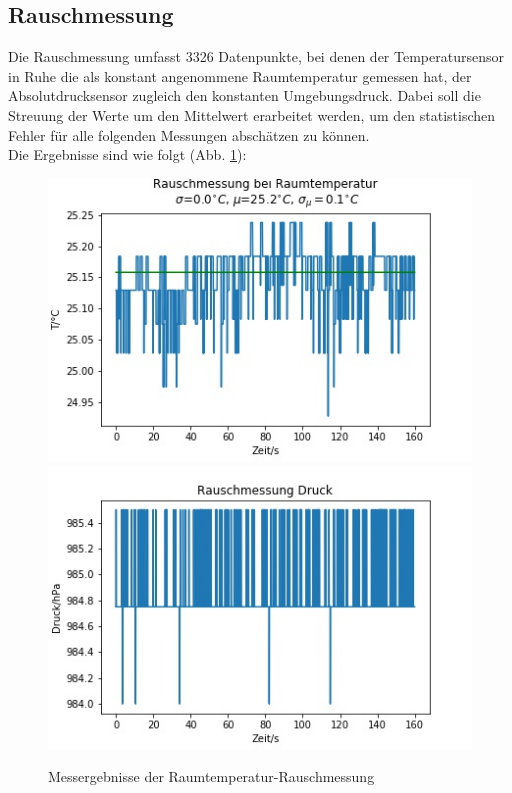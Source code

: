 \documentclass[]{article}
\begin{document}
	\subsection{Rauschmessung}
	Die Rauschmessung umfasst 3326 Datenpunkte, bei denen der Temperatursensor in Ruhe die als konstant angenommene Raumtemperatur gemessen hat, der Absolutdrucksensor zugleich den konstanten Umgebungsdruck. Dabei soll die Streuung der Werte um den Mittelwert erarbeitet werden, um den statistischen Fehler für alle folgenden Messungen abschätzen zu können.\\
	Die Ergebnisse sind wie folgt (Abb. \ref{RM_T_p}):\\
	\begin{figure}[h]
		\begin{center}
			\includegraphics[scale=0.45]{Images/RauschmessungRT_T.jpg}
			\includegraphics[scale=0.45]{Images/RauschmessungRT_p.jpg}
			\caption{Messergebnisse der Raumtemperatur-Rauschmessung}
			\label{RM_T_p}
		\end{center}
	\end{figure}\\
\end{document}
